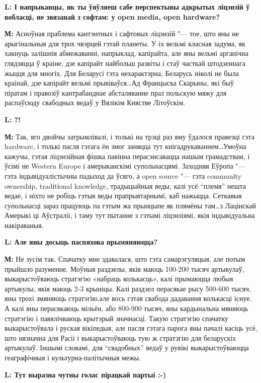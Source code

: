 \documentclass[10pt, a5paper]{article}
\begin{document}
{\noindent \bf L: І напрыканцы, як ты ўяўляеш сабе перспектывы адкрытых ліцэнзій ў вобласці, не звязанай з софтам: у open media, open hardware?}

{\noindent \bf М:} Асноўная праблема кантэнтных і сафтовых ліцэнзій "--- тое, што яны не арыгінальныя для трох чвэрцей гэтай планеты. У іх вельмі класная задума, як хакнуць залішнія абмежаванні, напрыклад, капірайта, але яны вельмі арганічна глядзяцца ў краіне, дзе капірайт найбольш развіты і стаў часткай штодзеннага жыцця для многіх. Для Беларусі гэта нехарактэрна, Беларусь ніколі не была краінай, дзе капірайт вельмі прывіваўся\ldots Ад Францыска Скарыны, які быў піратам і правозіў кантрабанднае абсталяванне праз польскую мяжу для распаўсюду свабодных ведаў у Вялікім Княстве Літоўскім.


{\noindent \bf L: ?!}

{\noindent \bf М:} Так, яго двойчы затрымлівалі, і толькі на трэці раз яму ўдалося правезці гэта hardware, і толькі пасля гэтага ён змог заняцца тут кнігадрукаваннем\ldots Умоўна кажучы, гэтая ліцэнзійная фішка павінна перасэнсавацца нашым грамадствам, і ўсімі не Western Europe і амерыканскімі супольнасцямі. Заходняя Еўропа "--- гэта індывідуалістычны падыход да ўсяго, а open source "--- гэта communіty ownershіp, tradіtіonal knowledge, традыцыйныя веды, калі усё “племя” нешта ведае, і ніхто не робіць гэтыя веды прапрыятарнымі, каб нажыцца. Сеткавыя супольнасці зараз працуюць па гэтым жа прынцыпе як плямёны там\ldots з Лацінскай Амерыкі ці Аўстраліі, і таму тут пытанне з гэтымі ліцэнзіямі, якія індывідуальна накіраваныя.

{\noindent \bf L: Але яны досыць паспяхова прымяняюцца?}

{\noindent \bf М:} Не зусім так. Спачатку мне здавалася, што гэта самарэгуляцыя, але потым прыйшло разуменне. Моўныя раздзелы, якія маюць 100-200 тысяч артыкулаў, выкарыстоўваюць стратэгію «набраць колькасць», калі прымаюцца любыя артыкулы, якія маюць 2-3 крыніцы. Калі раздзел перасякае рысу 500-600 тысяч, яны трохі змяняюць стратэгію,але вось гэтая свабода дадавання колькасці існуе. А калі яны перасякаюць мільён, або 800-900 тысяч, яны кардынальна мяняюць стратэгію і павялічваюць крытэрый значнасці. Такую стратэгію спачатку выкарыстоўвала і руская вікіпедыя, але пасля гэтага парога яны пачалі касіць усё, што нязначна для Расіі і выкарыстоўваюць тую ж стратэгію для беларускіх артыкулаў. Іншымі словамі, для “свадобных” ведаў у рувікі выкарыстоўваюцца геаграфічныя і культурна-палітычныя межы.


{\noindent \bf L: Тут выразна чутны голас пірацкай партыі :-)}
\end{document}
